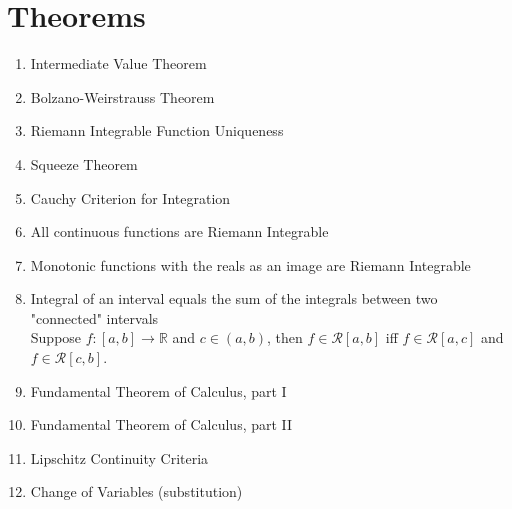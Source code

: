 \documentclass{article}
\newcommand{\reals}{{\mathbb R}}
\newcommand{\scriptR}{\mathcal{R}}
\begin{document}
\section{Theorems}
\begin{enumerate}
\item Intermediate Value Theorem \label{IVT}\hfill \\

\item Bolzano-Weirstrauss Theorem \label{BWT}\hfill \\

\item Riemann Integrable Function Uniqueness \label{RIFU}\hfill \\

\item Squeeze Theorem \label{Squeeze}\hfill \\

\item Cauchy Criterion for Integration  \label{CauchyCritInt}\hfill \\

\item All continuous functions are Riemann Integrable \label{continuousEqR}\hfill \\

\item Monotonic functions with the reals as an image are Riemann Integrable \label{monotonicEqR}\hfill \\

\item Integral of an interval equals the sum of the integrals between two "connected" intervals\hfill \\
        Suppose \(f:[a,b]\to\reals\) and \(c\in(a,b)\), then \(f\in\scriptR[a,b]\) iff \(f\in\scriptR[a,c]\) and \(f\in\scriptR[c,b]\).

\item Fundamental Theorem of Calculus, part I\label{FTC1}\hfill \\

\item Fundamental Theorem of Calculus, part II\label{FTC2}\hfill \\

\item Lipschitz Continuity Criteria\label{LipschitzCont}\hfill \\

    \item Change of Variables (substitution)\label{usub}\hfill \\


\end{enumerate}
\end{document}
